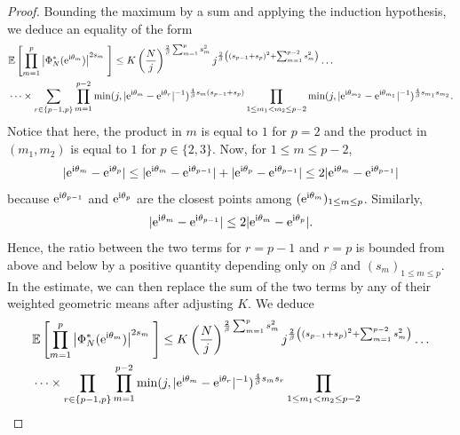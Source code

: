 \documentclass[]{article}
\begin{document}
\begin{proof}
Bounding the maximum by a sum and applying the induction hypothesis, we deduce an equality of the form
\begin{align*}& \mathbb{E} \left[ \prod_{m=1}^p \left|\Phi^*_{N} (\mathrm{e}^{\textnormal{i} \theta_m})\right|^{2s_m} \;  \right]
 \leq K \left( \frac{N}{j} \right)^{\frac{2}{\beta} \sum_{m=1}^p s_m^2} 
j^{\frac{2}{\beta} \left( (s_{p-1} + s_p)^2 + \sum_{m=1}^{p-2}  s_m^2 \right)}
 \dots
\\ &
\dots \times
\sum_{r \in \{p-1,p\}}
\prod_{m =1}^{p-2}
\min(j, |\mathrm{e}^{\textnormal{i} \theta_{m}} - \mathrm{e}^{\textnormal{i} \theta_{r}} |^{-1})^{\frac{4}{\beta} s_{m} (s_{p-1} + s_p)}   \prod_{1 \leq m_1 < m_2 \leq p-2} 
\min(j, |\mathrm{e}^{\textnormal{i} \theta_{m_2}} - \mathrm{e}^{\textnormal{i} \theta_{m_1}} |^{-1})^{\frac{4}{\beta} s_{m_1} s_{m_2}}.
\end{align*}
Notice that here, the product in $m$ is equal to $1$ for $p = 2$ and the product in $(m_1, m_2)$ is equal to $1$ for $p \in \{2,3\}$. 
Now, for $1 \leq m \leq p-2$, 
$$|\mathrm{e}^{\textnormal{i} \theta_{m}} - \mathrm{e}^{\textnormal{i} \theta_{p}} | \leq 
|\mathrm{e}^{\textnormal{i} \theta_{m}} - \mathrm{e}^{\textnormal{i} \theta_{p-1}} |
+ |\mathrm{e}^{\textnormal{i} \theta_{p}} - \mathrm{e}^{\textnormal{i} \theta_{p-1}} |
\leq 2 |\mathrm{e}^{\textnormal{i} \theta_{m}} - \mathrm{e}^{\textnormal{i} \theta_{p-1}} |
$$
because $\mathrm{e}^{\textnormal{i} \theta_{p-1}}$
and $\mathrm{e}^{\textnormal{i} \theta_{p}}$ are the closest points among $(\mathrm{e}^{\textnormal{i} \theta_{m}})_{1 \leq m \leq p}$. Similarly, 
$$|\mathrm{e}^{\textnormal{i} \theta_{m}} - \mathrm{e}^{\textnormal{i} \theta_{p-1}} | \leq 2 |\mathrm{e}^{\textnormal{i} \theta_{m}} - \mathrm{e}^{\textnormal{i} \theta_{p}} |.$$
Hence, the ratio between the two terms for $r = p-1$ and $r = p$ is bounded from above and below by a positive quantity depending only on $\beta$ and 
$(s_m)_{1 \leq m \leq p}$. 
In the estimate, we can then replace the sum of the two terms by 
any of their weighted geometric means after adjusting $K$. We deduce 
\begin{align*}& \mathbb{E} \left[ \prod_{m=1}^p \left|\Phi^*_{N} (\mathrm{e}^{\textnormal{i} \theta_m})\right|^{2s_m} \;  \right]
 \leq K \left( \frac{N}{j} \right)^{\frac{2}{\beta} \sum_{m=1}^p s_m^2} 
j^{\frac{2}{\beta} \left( (s_{p-1} + s_p)^2 + \sum_{m=1}^{p-2}  s_m^2 \right)}
 \dots
\\ &
\dots \times
\prod_{r \in \{p-1,p\}}
\prod_{m =1}^{p-2}
\min(j, |\mathrm{e}^{\textnormal{i} \theta_{m}} - \mathrm{e}^{\textnormal{i} \theta_{r}} |^{-1})^{\frac{4}{\beta} s_{m} s_r}   \prod_{1 \leq m_1 < m_2 \leq p-2} 

\end{align*}
\end{proof}
\end{document}
